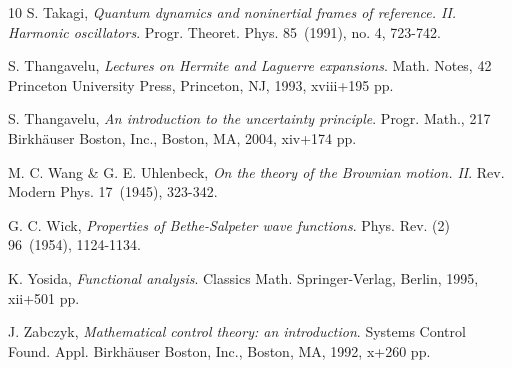 \documentclass[11pt,a4paper]{amsart}
\numberwithin{equation}{section}
\numberwithin{equation}{section}
\begin{document}
\begin{thebibliography}{10}
S. Takagi, \emph{Quantum dynamics and noninertial frames of reference. II. Harmonic oscillators}.
Progr. Theoret. Phys. 85~(1991), no. 4, 723-742.

S. Thangavelu, \emph{Lectures on Hermite and Laguerre expansions}.
Math. Notes, 42
Princeton University Press, Princeton, NJ, 1993, xviii+195 pp.

S. Thangavelu, \emph{An introduction to the uncertainty principle}.
Progr. Math., 217
Birkh\"auser Boston, Inc., Boston, MA, 2004, xiv+174 pp.


M. C. Wang \& G. E. Uhlenbeck, \emph{
On the theory of the Brownian motion. II}.
Rev. Modern Phys. 17~(1945), 323-342.


G. C. Wick, \emph{Properties of Bethe-Salpeter wave functions}.
Phys. Rev. (2) 96~(1954), 1124-1134.

K. Yosida, \emph{Functional analysis}.
Classics Math.
Springer-Verlag, Berlin, 1995, xii+501 pp.

J. Zabczyk, \emph{Mathematical control theory: an introduction}.
Systems Control Found. Appl.
Birkh\"auser Boston, Inc., Boston, MA, 1992, x+260 pp.



\end{thebibliography}
\end{document}

